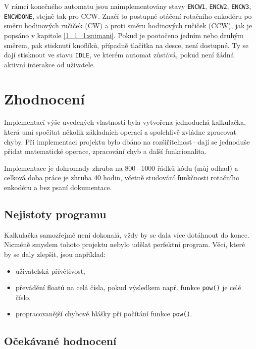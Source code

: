 \documentclass[a4paper, 11pt]{article}
\begin{document}
V rámci konečného automatu jsou naimplementovány stavy \texttt{EN\textunderscore CW1}, \texttt{EN\textunderscore CW2}, \texttt{EN\textunderscore CW3}, \texttt{EN\textunderscore CW\textunderscore DONE}, stejně tak pro CCW.
Značí to postupné otáčení rotačního enkodéru po směru hodinových ručiček (CW) a proti směru hodinových ručiček (CCW), jak je popsáno v kapitole \ref{1_1_1:snimani}.
Pokud je pootočeno jedním nebo druhým směrem, pak stisknutí knoflíků, případně tlačítka na desce, není dostupné.
Ty se dají stisknout ve stavu \texttt{IDLE}, ve kterém automat zůstává, pokud není žádná aktivní interakce od uživatele.

\section{Zhodnocení}\label{3:zhodnoceni}

Implementací výše uvedených vlastností byla vytvořena jednoduchá kalkulačka, která umí spočítat několik základních operací a spolehlivě zvládne zpracovat chyby.
Při implementaci projektu bylo dbáno na rozšiřitelnost\,--\,dají se jednoduše přidat matematické operace, zpracování chyb a další funkcionalita.

Implementace je dohromady zhruba na 800\,--\,1000 řádků kódu (můj odhad) a celková doba práce je zhruba 40 hodin, včetně studování funkčnosti rotačního enkodéru a bez psaní dokumentace.

\subsection{Nejistoty programu}\label{3_1:nejistoty}

Kalkulačka samozřejmě není dokonalá, vždy by se dala více dotáhnout do konce. 
Nicméně smyslem tohoto projektu nebylo udělat perfektní program.
Věci, které by se daly zlepšit, jsou například:
\begin{itemize}
    \item uživatelská přívětivost,
    \item převádění floatů na celá čísla, pokud výsledkem např. funkce \texttt{pow()} je celé číslo,
    \item propracovanější chybové hlášky při počítání funkce \texttt{pow()}.
\end{itemize}

\subsection{Očekávané hodnocení}\label{3_2:hodnoceni}
\end{document}
